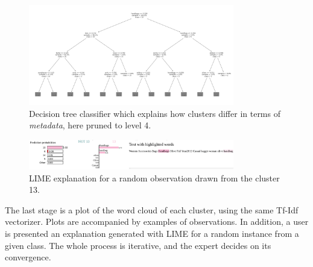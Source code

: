 \documentclass[
 twocolumn,
 hf,
]{ceurart}
\begin{document}
\begin{figure}[h!]
  \centering
  \includegraphics[width=0.8\textwidth]{tree-improved}
  \caption{Decision tree classifier which explains how clusters differ in terms of \textit{metadata}, here pruned to level 4.}
  \label{fig:decision_tree}
\end{figure}

\begin{figure}[h!]
  \centering
  \includegraphics[width=0.8\textwidth]{example1-clustering-products-fashion-tex/LIME_13_handbags-Selection_265}
  \caption{LIME explanation for a random observation drawn from the cluster 13.}
  \label{fig:lime}
\end{figure}

The last stage is a plot of the word cloud of each cluster, using the same Tf-Idf vectorizer.
Plots are accompanied by examples of observations.%
In addition, a user is presented an explanation generated with LIME for a random instance from a given class.
The whole process is iterative, and the expert decides on its convergence.

%
\end{document}
